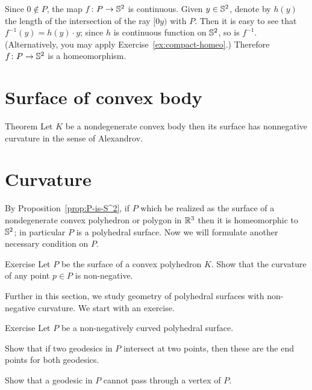 Since $0\notin P$, the map $f\colon P\to\mathbb{S}^2$ is continuous.
Given $y\in \mathbb{S}^2$,
denote by $h(y)$ the length of the intersection of the ray $[0y)$ with $P$. 
Then it is easy to see that $f^{-1}(y)=h(y)\cdot y$;
since $h$ is continuous function on $\mathbb{S}^2$, so is $f^{-1}$.
(Alternatively, you may apply
 Exercise~\ref{ex:compact-homeo}.)
Therefore $f\colon P\to\mathbb{S}^2$ is a homeomorphism.
\qeds

\section{Surface of convex body}

\begin{thm}{Theorem}
Let $K$ be a nondegenerate convex body
then its surface has nonnegative curvature in the sense of Alexandrov.
\end{thm}



\section{Curvature}


By Proposition~\ref{prop:P-is-S^2},
if $P$ which be realized as the surface of a nondegenerate convex polyhedron or polygon in $\mathbb{R}^3$ then it is homeomorphic to $\mathbb{S}^2$;
in particular $P$ is a polyhedral surface.
Now we will formulate another necessary condition on $P$.

\begin{thm}{Exercise}\label{ex:curv-is-nonneg}
Let $P$ be the surface of a convex polyhedron $K$. Show that the curvature of any point $p\in P$ is non-negative. 
\end{thm}

Further in this section, 
we study geometry of polyhedral surfaces with non-negative curvature.
We start with an exercise.

\begin{thm}{Exercise}\label{ex:poly+geod}
Let $P$ be a non-negatively curved polyhedral surface.

\begin{subthm}{}
Show that if two geodesics in $P$ intersect at two points, 
then these are the end points for both geodesics.
\end{subthm}

\begin{subthm}{}
Show that a geodesic in $P$ cannot pass through a vertex of $P$.
\end{subthm}

\end{thm}

